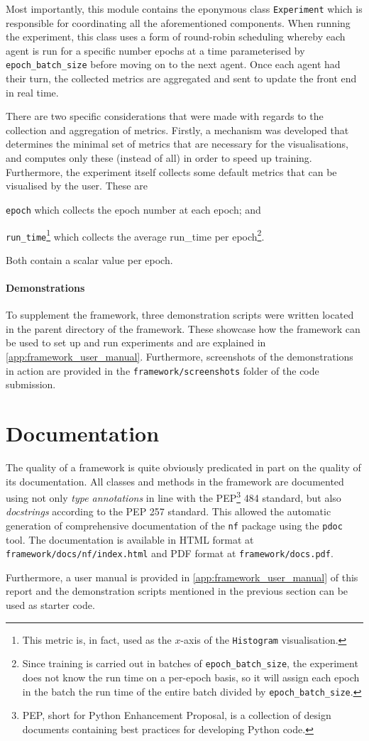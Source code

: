 Most importantly, this module contains the eponymous class \texttt{Experiment} which is responsible for coordinating all the aforementioned components.
When running the experiment, this class uses a form of round-robin scheduling whereby each agent is run for a specific number epochs at a time parameterised by \texttt{epoch\_batch\_size} before moving on to the next agent.
Once each agent had their turn, the collected metrics are aggregated and sent to update the front end in real time.

There are two specific considerations that were made with regards to the collection and aggregation of metrics. 
Firstly, a mechanism was developed that determines the minimal set of metrics that are necessary for the visualisations, and computes only these (instead of all) in order to speed up training.
Furthermore, the experiment itself collects some default metrics that can be visualised by the user.
These are
\begin{enumerate*}[label=(\roman*)]
    \item \texttt{epoch} which collects the epoch number at each epoch; and
    \item \texttt{run\_time}\footnote{This metric is, in fact, used as the $x$-axis of the \texttt{Histogram} visualisation.} which collects the average run\_time per epoch\footnote{Since training is carried out in batches of \texttt{epoch\_batch\_size}, the experiment does not know the run time on a per-epoch basis, so it will assign each epoch in the batch the run time of the entire batch divided by \texttt{epoch\_batch\_size}.}.
\end{enumerate*}
Both contain a scalar value per epoch.

\paragraph{Demonstrations}
To supplement the framework, three demonstration scripts were written located in the parent directory of the framework.
These showcase how the framework can be used to set up and run experiments and are explained in \ref{app:framework_user_manual}.
Furthermore, screenshots of the demonstrations in action are provided in the \texttt{framework/screenshots} folder of the code submission.

\section{Documentation}
The quality of a framework is quite obviously predicated in part on the quality of its documentation.
All classes and methods in the framework are documented using not only \textit{type annotations} in line with the PEP\footnote{PEP, short for Python Enhancement Proposal, is a collection of design documents containing best practices for developing Python code.} 484 standard, but also \textit{docstrings} according to the PEP 257 standard.
This allowed the automatic generation of comprehensive documentation of the \texttt{nf} package using the \texttt{pdoc} tool. 
The documentation is available in HTML format at \texttt{framework/docs/nf/index.html} and PDF format at \texttt{framework/docs.pdf}.

Furthermore, a user manual is provided in \ref{app:framework_user_manual} of this report and the demonstration scripts mentioned in the previous section can be used as starter code.


